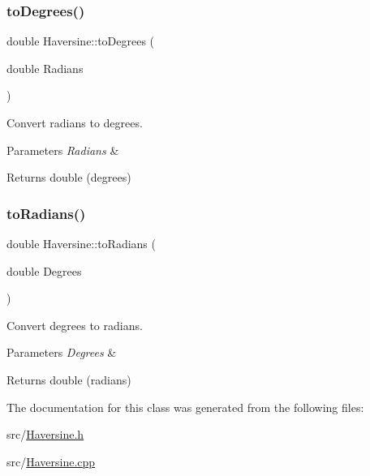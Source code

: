 \subsubsection{\texorpdfstring{to\+Degrees()}{toDegrees()}}
{\footnotesize\ttfamily double Haversine\+::to\+Degrees (\begin{DoxyParamCaption}\item[{double}]{Radians }\end{DoxyParamCaption})\hspace{0.3cm}{\ttfamily [static]}}



Convert radians to degrees. 


\begin{DoxyParams}{Parameters}
{\em Radians} & \\
\hline
\end{DoxyParams}
\begin{DoxyReturn}{Returns}
double (degrees) 
\end{DoxyReturn}
\mbox{\label{class_haversine_af0832536dda3b76d4e43798de71dc9a6}} 
\subsubsection{\texorpdfstring{to\+Radians()}{toRadians()}}
{\footnotesize\ttfamily double Haversine\+::to\+Radians (\begin{DoxyParamCaption}\item[{double}]{Degrees }\end{DoxyParamCaption})\hspace{0.3cm}{\ttfamily [static]}}



Convert degrees to radians. 


\begin{DoxyParams}{Parameters}
{\em Degrees} & \\
\hline
\end{DoxyParams}
\begin{DoxyReturn}{Returns}
double (radians) 
\end{DoxyReturn}


The documentation for this class was generated from the following files\+:\begin{DoxyCompactItemize}
\item 
src/\hyperlink{_haversine_8h}{Haversine.\+h}\item 
src/\hyperlink{_haversine_8cpp}{Haversine.\+cpp}\end{DoxyCompactItemize}
